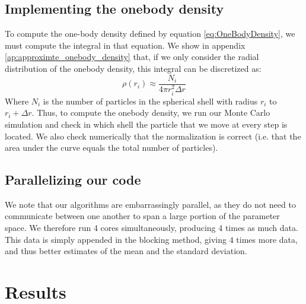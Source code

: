 \documentclass[a4paper, 10pt]{article}
\begin{document}
	\subsection{Implementing the onebody density}\label{sec:MetOneBody}
	To compute the one-body density defined by equation \ref{eq:OneBodyDensity}, we must compute the integral in that equation. We show in appendix \ref{ap:approximte_onebody_density} that, if we only consider the radial distribution of the onebody density, this integral can be discretized as:
	\begin{equation}
		\rho(r_i)\approx \frac{N_i}{4\pi r_i^2 \Delta r}
		\end{equation}
		Where $N_i$ is the number of particles in the spherical shell with radius $r_i$ to $r_i+\Delta r$. Thus, to compute the onebody density, we run our Monte Carlo simulation and check in which shell the particle that we move at every step is located. We also check numerically that the normalization is correct (i.e. that the area under the curve equals the total number of particles).
	\subsection{Parallelizing our code}
	We note that our algorithms are embarrassingly parallel, as they do not need to communicate between one another to span a large portion of the parameter space. We therefore run 4 cores simultaneously, producing 4 times as much data. This data is simply appended in the blocking method, giving $4$ times more data, and thus better estimates of the mean and the standard deviation.
	\newpage
	\section{Results}
\end{document}
